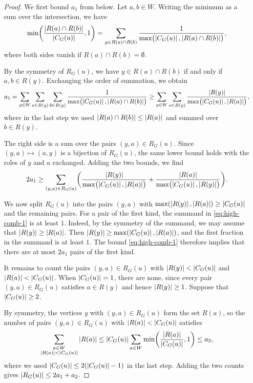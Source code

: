 \begin{proof}
We first bound $a_1$ from below. Let $a, b \in W$. Writing the minimum as a sum over the intersection, we have
\[
\min \biggl( \frac{\left|R(a) \cap R(b)\right|}{\left|C_G(u)\right|}, 1 \biggr) = \sum_{y \in R(a) \cap R(b)} \frac{1}{\max \bigl( \left|C_G(u)\right|, \left|R(a) \cap R(b)\right| \bigr)},
\]
where both sides vanish if $R(a) \cap R(b) = \emptyset$.

By the symmetry of $R_G(u)$, we have $y \in R(a) \cap R(b)$ if and only if $a, b \in R(y)$. Exchanging the order of summation, we obtain
\[
a_1 = \sum_{y \in W} \sum_{a \in R(y)} \sum_{b \in R(y)} \frac{1}{\max \bigl( \left|C_G(u)\right|, \left|R(a) \cap R(b)\right| \bigr)} \ge \sum_{y \in W} \sum_{a \in R(y)} \frac{\left|R(y)\right|}{\max \bigl( \left|C_G(u)\right|, \left|R(a)\right| \bigr)},
\]
where in the last step we used $\left|R(a) \cap R(b)\right| \le \left|R(a)\right|$ and summed over $b \in R(y)$.

The right side is a sum over the pairs $(y, a) \in R_G(u)$. Since $(y, a) \mapsto (a, y)$ is a bijection of $R_G(u)$, the same lower bound holds with the roles of $y$ and $a$ exchanged. Adding the two bounds, we find
\begin{equation}\label{eq:high-comb-1}
2 a_1 \ge \sum_{(y, a) \in R_G(u)} \biggl( \frac{\left|R(y)\right|}{\max \bigl( \left|C_G(u)\right|, \left|R(a)\right| \bigr)} + \frac{\left|R(a)\right|}{\max \bigl( \left|C_G(u)\right|, \left|R(y)\right| \bigr)} \biggr).
\end{equation}

We now split $R_G(u)$ into the pairs $(y, a)$ with $\max(\left|R(y)\right|, \left|R(a)\right|) \ge \left|C_G(u)\right|$ and the remaining pairs. For a pair of the first kind, the summand in \eqref{eq:high-comb-1} is at least $1$. Indeed, by the symmetry of the summand, we may assume that $\left|R(y)\right| \ge \left|R(a)\right|$. Then $\left|R(y)\right| \ge \max(\left|C_G(u)\right|, \left|R(a)\right|)$, and the first fraction in the summand is at least $1$. The bound \eqref{eq:high-comb-1} therefore implies that there are at most $2 a_1$ pairs of the first kind.

It remains to count the pairs $(y, a) \in R_G(u)$ with $\left|R(y)\right| < \left|C_G(u)\right|$ and $\left|R(a)\right| < \left|C_G(u)\right|$. When $\left|C_G(u)\right| = 1$, there are none, since every pair $(y, a) \in R_G(u)$ satisfies $a \in R(y)$ and hence $\left|R(y)\right| \ge 1$. Suppose that $\left|C_G(u)\right| \ge 2$.

By symmetry, the vertices $y$ with $(y, a) \in R_G(u)$ form the set $R(a)$, so the number of pairs $(y, a) \in R_G(u)$ with $\left|R(a)\right| < \left|C_G(u)\right|$ satisfies
\[
\sum_{\substack{a \in W \\ \left|R(a)\right| < \left|C_G(u)\right|}} \left|R(a)\right| \le \left|C_G(u)\right| \sum_{a \in W} \min \biggl( \frac{\left|R(a)\right|}{\left|C_G(u)\right|}, 1 \biggr) \le a_2,
\]
where we used $\left|C_G(u)\right| \le 2 (\left|C_G(u)\right| - 1)$ in the last step. Adding the two counts gives $\left|R_G(u)\right| \le 2 a_1 + a_2$.
\end{proof}

